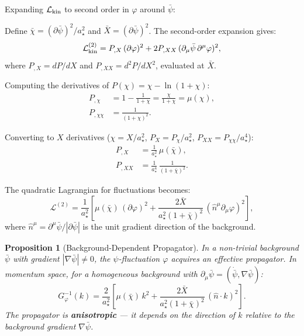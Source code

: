 \documentclass[11pt,a4paper]{article}
\newtheorem{proposition}{Proposition}
\begin{document}
Expanding $\mathcal{L}_{\rm kin}$ to second order in $\varphi$ around $\bar{\psi}$:

Define $\bar{\chi} = (\partial\bar{\psi})^2/a_\star^2$ and $\bar{X} = (\partial\bar{\psi})^2$. The second-order expansion gives:
\begin{equation}\label{eq:second-order}
\mathcal{L}_{\rm kin}^{(2)} = P_{,X}\,(\partial\varphi)^2
+ 2P_{,XX}\,(\partial_\mu\bar{\psi}\,\partial^\mu\varphi)^2,
\end{equation}
where $P_{,X} = dP/dX$ and $P_{,XX} = d^2P/d X^2$, evaluated at $\bar{X}$.

Computing the derivatives of $P(\chi) = \chi - \ln(1+\chi)$:
\begin{align}
P_{,\chi} &= 1 - \frac{1}{1+\chi} = \frac{\chi}{1+\chi} = \mu(\chi), \label{eq:P-chi}\\
P_{,\chi\chi} &= \frac{1}{(1+\chi)^2}. \label{eq:P-chichi}
\end{align}

Converting to $X$ derivatives ($\chi = X/a_\star^2$, $P_X = P_\chi / a_\star^2$, $P_{XX} = P_{\chi\chi}/a_\star^4$):
\begin{align}
P_{,X} &= \frac{1}{a_\star^2}\,\mu(\bar{\chi}), \\
P_{,XX} &= \frac{1}{a_\star^4}\,\frac{1}{(1+\bar{\chi})^2}.
\end{align}

The quadratic Lagrangian for fluctuations becomes:
\begin{equation}\label{eq:L2-final}
\boxed{
\mathcal{L}^{(2)} = \frac{1}{a_\star^2}\left[
\mu(\bar\chi)\,(\partial\varphi)^2
+ \frac{2\bar{X}}{a_\star^2(1+\bar\chi)^2}\,
(\hat{n}^\mu\partial_\mu\varphi)^2
\right],
}
\end{equation}
where $\hat{n}^\mu = \partial^\mu\bar{\psi}/|\partial\bar{\psi}|$ is the unit gradient direction of the background.

\begin{proposition}[Background-Dependent Propagator]
\label{prop:propagator}
In a non-trivial background $\bar{\psi}$ with gradient $|\nabla\bar{\psi}| \neq 0$, the $\psi$-fluctuation $\varphi$ acquires an effective propagator. In momentum space, for a homogeneous background with $\partial_\mu\bar\psi = (\dot{\bar\psi}, \nabla\bar\psi)$:
\begin{equation}\label{eq:propagator}
G_\varphi^{-1}(k) = \frac{2}{a_\star^2}\left[
\mu(\bar\chi)\,k^2
+ \frac{2\bar{X}}{a_\star^2(1+\bar\chi)^2}\,(\hat{n}\cdot k)^2
\right].
\end{equation}
The propagator is \textbf{anisotropic} --- it depends on the direction of $k$ relative to the background gradient $\nabla\bar\psi$.
\end{proposition}
\end{document}
